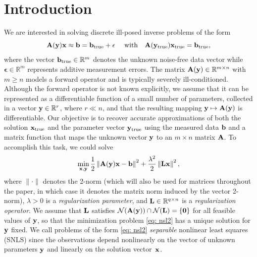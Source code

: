 \documentclass[onefignum,onetabnum]{siamart171218}
\newcommand{\bA}{{\bf A}}
\newcommand{\bL}{{\bf L}}
\newcommand{\bb}{{\bf b}}
\newcommand{\bx}{{\bf x}}
\newcommand{\by}{{\bf y}}
\begin{document}
\section{Introduction} We %
are interested in solving discrete ill-posed inverse problems of the %
form 
\begin{equation*}
\bA(\by)\bx  \approx \bb =  \bb_{\rm true} + \mathbf{\epsilon} \quad \mbox{ with\quad } \bA( \by_{\rm true}) \bx_{\rm true} = \bb_{\rm true},
\end{equation*}
where %
the vector $\bb_{\rm true} \in \mathbb{R}^m$ denotes the unknown noise-free data vector while $\mathbf{\epsilon} \in \mathbb{R}^m$ represents additive measurement errors. The matrix $\bA(\by) \in \mathbb{R}^{m\times n}$ with $m\geq n$ models a forward operator and is typically severely ill-conditioned. Although the forward operator is not known explicitly, we assume that it can be represented as a differentiable function of a small number of parameters, collected in a vector $\by \in \mathbb{R}^r$, where $r \ll n$, and that the resulting mapping $\by \mapsto \bA(\by)$ is differentiable. Our objective is to recover accurate approximations of both the solution $\bx_{\rm true}$ and the parameter vector $\by_{\rm true}$ using the measured data $\bb$ and a matrix function that maps the unknown vector $\by$ to an $m \times n$ matrix $\bA$. To accomplish this task, we could solve
\begin{equation}\label{eq: nsl2}
\min_{\bx, \by} \frac{1}{2}\left\|\bA(\by)\bx - \bb \right\|^2 + \frac{\lambda^2}{2} \left\|\bL \bx\right\|^2,
\end{equation}
where $\|\cdot\|$ denotes the 2-norm (which will also be used for matrices throughout the paper, in which case it denotes the matrix norm induced by the vector 2-norm), $\lambda>0$ is a \emph{regularization parameter}, and $\bL \in \mathbb{R}^{q\times n}$ is a \emph{regularization operator}. We assume that $\bL$ satisfies $\mathcal{N}(\bA(\by)) \cap \mathcal{N} (\bL) = \{\boldsymbol{0}\}$ for all feasible values of $\by$, so that the minimization problem \eqref{eq: nsl2} has a unique solution for $\by$ fixed. We call %
problems of %
the form \eqref{eq: nsl2}  \emph{separable} nonlinear least squares (SNLS) since the observations depend nonlinearly on the vector of unknown parameters $\by$ and linearly on the solution vector~$\bx$. 
\end{document}

